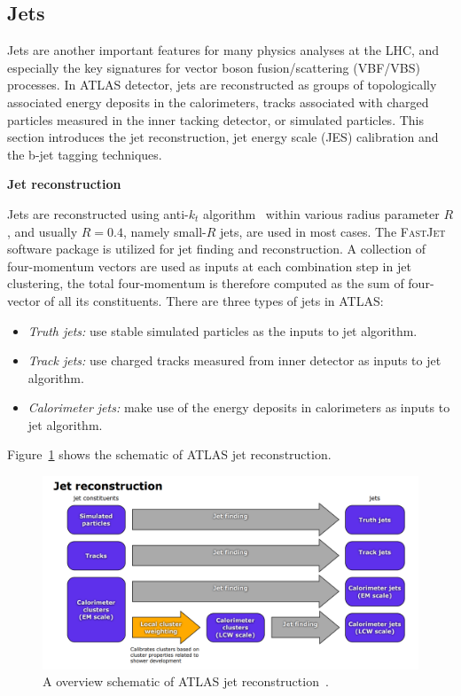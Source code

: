 \subsection{Jets}
\label{sec:jet}

Jets are another important features for many physics analyses at the LHC, and especially the key signatures for vector boson fusion/scattering (VBF/VBS) processes.
In ATLAS detector, jets are reconstructed as groups of topologically associated energy deposits in the calorimeters, 
tracks associated with charged particles measured in the inner tacking detector, or simulated particles.
This section introduces the jet reconstruction, jet energy scale (JES) calibration and the b-jet tagging techniques.

\textbf{Jet reconstruction}

Jets are reconstructed using anti-$k_{t}$ algorithm~\cite{Cacciari_2008} within various radius parameter $R$,
and usually $R = 0.4$, namely small-$R$ jets, are used in most cases.
The \textsc{FastJet} software package\cite{Cacciari2012} is utilized for jet finding and reconstruction.
A collection of four-momentum vectors are used as inputs at each combination step in jet clustering, 
the total four-momentum is therefore computed as the sum of four-vector of all its constituents.
There are three types of jets in ATLAS:
\begin{itemize}
	\item \textit{Truth jets:} use stable simulated particles as the inputs to jet algorithm.
	\item \textit{Track jets:} use charged tracks measured from inner detector as inputs to jet algorithm.
	\item \textit{Calorimeter jets:} make use of the energy deposits in calorimeters as inputs to jet algorithm.
\end{itemize}
Figure~\ref{fig:jet_reco_overview} shows the schematic of ATLAS jet reconstruction.
\begin{figure}[!htb]
  \centering
  \includegraphics[width=1.0\textwidth]{figures/Simulation/threetypes_jet_reco.png}
  \caption{A overview schematic of ATLAS jet reconstruction~\cite{Aad:2014bia}.}
  \label{fig:jet_reco_overview}
\end{figure}

